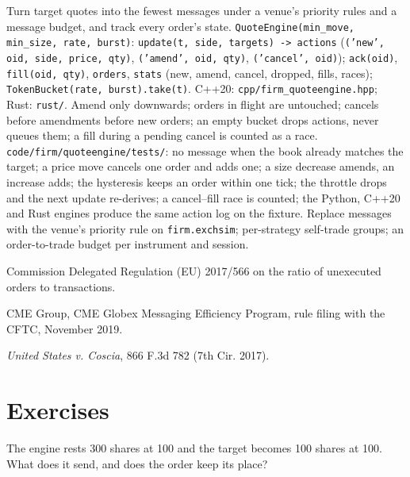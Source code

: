 \begin{build}
 Turn target quotes into the fewest messages under a venue's priority rules and a message budget, and track every order's state.
 \texttt{QuoteEngine(min\_move, min\_size, rate, burst)}: \texttt{update(t, side, targets) -> actions} (\texttt{('new', oid, side, price,
qty)}, \texttt{('amend', oid, qty)}, \texttt{('cancel', oid)}); \texttt{ack(oid)}, \texttt{fill(oid, qty)}, \texttt{orders}, \texttt{stats}
(new, amend, cancel, dropped, fills, races); \texttt{TokenBucket(rate, burst).take(t)}. C++20: \texttt{cpp/firm\_quoteengine.hpp}; Rust:
\texttt{rust/}.
 Amend only downwards; orders in flight are untouched; cancels before amendments before new orders; an empty bucket drops actions,
never queues them; a fill during a pending cancel is counted as a race.
 \texttt{code/firm/quoteengine/tests/}: no message when the book already matches the target; a price move cancels one
order and adds one; a size decrease amends, an increase adds; the hysteresis keeps an order within one tick; the throttle drops and the next update
re-derives; a cancel--fill race is counted; the Python, C++20 and Rust engines produce the same action log on the fixture.
 Replace messages with the venue's priority rule on \texttt{firm.exchsim}; per-strategy self-trade groups; an order-to-trade budget per
instrument and session.
\end{build}

\begin{omsources}
\item Commission Delegated Regulation (EU) 2017/566 on the ratio of unexecuted orders to transactions.
\item CME Group, CME Globex Messaging Efficiency Program, rule filing with the CFTC, November 2019.
\item \emph{United States v. Coscia}, 866 F.3d 782 (7th Cir. 2017).
\end{omsources}

\section{Exercises}

\begin{exercise}[$\star$]\label{exo:hf:the-quoting-engine:1}
The engine rests 300 shares at 100 and the target becomes 100 shares at 100. What does it send, and does the order keep its place?
\end{exercise}

